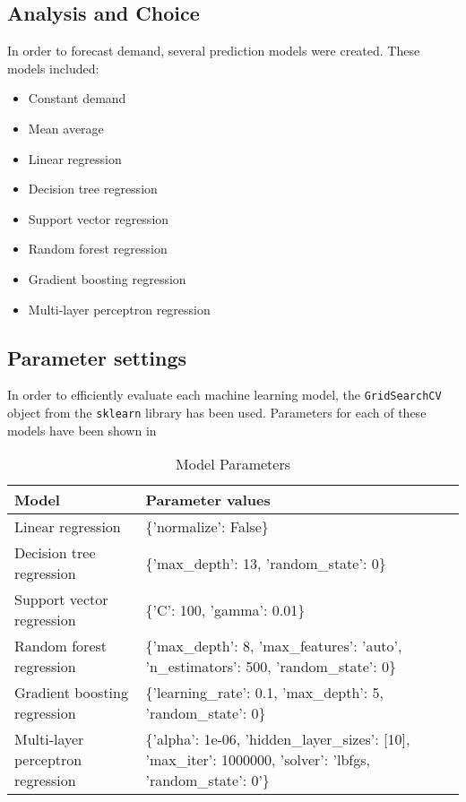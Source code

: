 \documentclass[final,authoryear,5p,times,twocolumn, 12pt]{elsarticle}
\begin{document}
\subsection{Analysis and Choice}
In order to forecast demand, several prediction models were created. These models included:
\begin{itemize}[noitemsep]
 \item Constant demand
 \item Mean average
 \item Linear regression
 \item Decision tree regression
 \item Support vector regression
 \item Random forest regression
 \item Gradient boosting regression
 \item Multi-layer perceptron regression
\end{itemize}
\subsection{Parameter settings}
In order to efficiently evaluate each machine learning model, the \texttt{GridSearchCV} object from the \texttt{sklearn} library has been used. Parameters for each of these models have been shown in
\begin{table}[b]
\begin{tabular}{p{}p{}}
\hline
Model                             & Parameter values                                                                                                  \\ \hline
Linear regression                 & \{'normalize': False\}                                                                                            \\
Decision tree regression          & \{'max\_depth': 13, 'random\_state': 0\}                                                                          \\
Support vector regression         & \{'C': 100, 'gamma': 0.01\}                                                                                       \\
Random forest regression          & \{'max\_depth': 8, 'max\_features': 'auto', 'n\_estimators': 500, 'random\_state': 0\}                            \\
Gradient boosting regression      & \{'learning\_rate': 0.1, 'max\_depth': 5, 'random\_state': 0\}                                                    \\
Multi-layer perceptron regression & \{'alpha': 1e-06, 'hidden\_layer\_sizes': {[}10{]}, 'max\_iter': 1000000, 'solver': 'lbfgs, 'random\_state': 0'\} \\ \hline
\end{tabular}
\caption{Model Parameters}
\label{tab:params}
\end{table}
\end{document}

